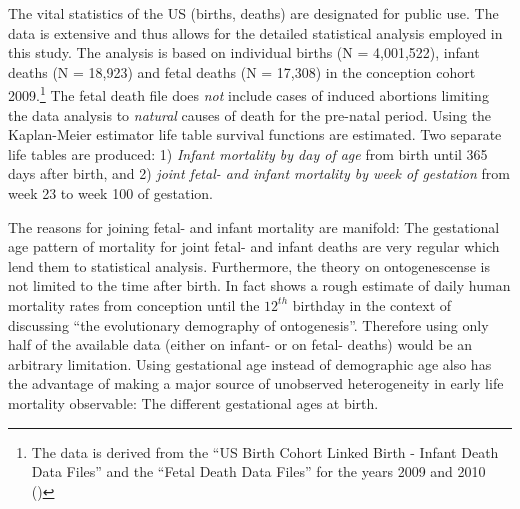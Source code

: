 \documentclass[12pt, parskip=half]{scrartcl}
\begin{document}
The vital statistics of the US (births, deaths) are designated for public use. The data is extensive and thus allows for the detailed statistical analysis employed in this study. The analysis is based on individual births (N = 4,001,522), infant deaths (N = 18,923) and fetal deaths (N = 17,308) in the conception cohort 2009.\footnote{The data is derived from the \enquote{US Birth Cohort Linked Birth - Infant Death Data Files} and the \enquote{Fetal Death Data Files} for the years 2009 and 2010 (\cite{DVS2015})} The fetal death file does \emph{not} include cases of induced abortions limiting the data analysis to \emph{natural} causes of death for the pre-natal period. Using the Kaplan-Meier estimator life table survival functions are estimated. Two separate life tables are produced: 1) \emph{Infant mortality by day of age} from birth until 365 days after birth, and 2) \emph{joint fetal- and infant mortality by week of gestation} from week 23 to week 100 of gestation.


The reasons for joining fetal- and infant mortality are manifold: The gestational age pattern of mortality for joint fetal- and infant deaths are very regular which lend them to statistical analysis. Furthermore, the theory on ontogenescense is not limited to the time after birth. In fact \textcite{Levitis2011} shows a rough estimate of daily human mortality rates from conception until the $12^{th}$ birthday in the context of discussing \enquote{the evolutionary demography of ontogenesis}. Therefore using only half of the available data (either on infant- or on fetal- deaths) would be an arbitrary limitation. Using gestational age instead of demographic age also has the advantage of making a major source of unobserved heterogeneity in early life mortality observable: The different gestational ages at birth.
\end{document}
